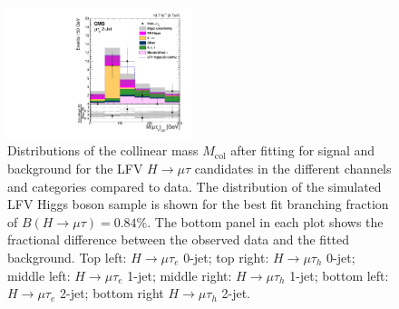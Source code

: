 \begin{figure}[hbtp]
 \includegraphics[width=0.48\textwidth]{muhad_VBF_m_colinear_UNBLIND_PostFit.pdf}
 \caption{Distributions of the collinear mass $M_\text{col}$ after fitting for signal and background  for the LFV $H \rightarrow \mu \tau$ candidates in
the different
channels and categories compared to data.
The distribution of the simulated LFV Higgs boson sample is shown for the best fit branching fraction
of $B(H \rightarrow \mu \tau )=0.84\%$.
The bottom panel in each plot shows the fractional difference between the observed data and the fitted background. Top left: $H \rightarrow \mu \tau_{e}$ 0-jet; top right: $H \rightarrow \mu \tau_{h}$ 0-jet;
middle left: $H \rightarrow \mu \tau_{e}$ 1-jet; middle right: $H \rightarrow \mu \tau_{h}$ 1-jet; bottom left: $H \rightarrow \mu \tau_{e}$ 2-jet; bottom right $H \rightarrow \mu \tau_{h}$ 2-jet.}
 \label{fig:Mcol_Postfit}\end{figure}

